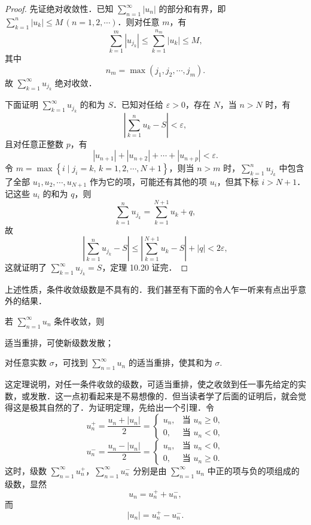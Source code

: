 \begin{proof}
先证绝对收敛性．已知 $\displaystyle\sum_{n=1}^{\infty}\left|u_{n}\right|$ 的部分和有界，即 $\sum_{k=1}^{n}\left|u_{k}\right|\leqslant M\,(n=1,2,\cdots)$．则对任意 $m$，有
\[
\sum_{k=1}^{m}\left|u_{j_{k}}\right|\leqslant\sum_{k=1}^{n_{m}}\left|u_{k}\right|\leqslant M,
\]
其中
\[
n_{m}=\max\left(j_{1},j_{2},\cdots,j_{m}\right).
\]
故 $\displaystyle\sum_{k=1}^{\infty}u_{j_{k}}$ 绝对收敛．

下面证明 $\displaystyle\sum_{k=1}^{\infty}u_{j_{k}}$ 的和为 $S$．已知对任给 $\varepsilon>0$，存在 $N$，当 $n>N$ 时，有
\[
\left|\sum_{k=1}^{n}u_{k}-S\right|<\varepsilon,
\]
且对任意正整数 $p$，有
\[
\left|u_{n+1}\right|+\left|u_{n+2}\right|+\cdots+\left|u_{n+p}\right|<\varepsilon.
\]
令 $m=\max\left\{i\mid j_{i}=k,\,k=1,2,\cdots,N+1\right\}$，则当 $n>m$ 时，$\sum_{k=1}^{n}u_{j_{k}}$ 中包含了全部 $u_{1},u_{2},\cdots,u_{N+1}$ 作为它的项，可能还有其他的项 $u_{i}$，但其下标 $i>N+1$．记这些 $u_{i}$ 的和为 $q$，则
\[
\sum_{k=1}^{n}u_{j_{k}}=\sum_{k=1}^{N+1}u_{k}+q,
\]
故
\[
\left|\sum_{k=1}^{n}u_{j_{k}}-S\right|\leqslant\left|\sum_{k=1}^{N+1}u_{k}-S\right|+\left|q\right|<2\varepsilon,
\]
这就证明了 $\displaystyle\sum_{k=1}^{\infty}u_{j_{k}}=S$，定理 10.20 证完．
\end{proof}

上述性质，条件收敛级数是不具有的．我们甚至有下面的令人乍一听来有点出乎意外的结果．

\begin{theorem}[黎曼]\label{thm:10-21}
若 $\displaystyle\sum_{n=1}^{\infty}u_{n}$ 条件收敛，则
\begin{ziti}
\item 适当重排，可使新级数发散；
\item 对任意实数 $\sigma$，可找到 $\displaystyle\sum_{n=1}^{\infty}u_{n}$ 的适当重排，使其和为 $\sigma$.
\end{ziti}
\end{theorem}

这定理说明，对任一条件收敛的级数，可适当重排，使之收敛到任一事先给定的实数，或发散．这一点初看起来是不易想像的．但当读者学了后面的证明后，就会觉得这是极其自然的了．为证明定理，先给出一个引理．令
\[
u_{n}^{+}=\frac{u_{n}+\left|u_{n}\right|}{2}=\begin{cases}u_{n},&\text{当 }u_{n}\geqslant 0,\\[2pt]0,&\text{当 }u_{n}<0,\end{cases}
\]
\[
u_{n}^{-}=\frac{u_{n}-\left|u_{n}\right|}{2}=\begin{cases}u_{n},&\text{当 }u_{n}<0,\\[2pt]0,&\text{当 }u_{n}\geqslant 0.\end{cases}
\]
这时，级数 $\displaystyle\sum_{n=1}^{\infty}u_{n}^{+}$，$\sum_{n=1}^{\infty}u_{n}^{-}$ 分别是由 $\sum_{n=1}^{\infty}u_{n}$ 中正的项与负的项组成的级数，显然
\[
u_{n}=u_{n}^{+}+u_{n}^{-},
\]
而
\[
\left|u_{n}\right|=u_{n}^{+}-u_{n}^{-}.
\]


